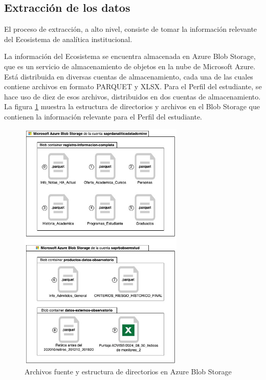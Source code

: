 \subsection{Extracción de los datos}
\label{subsec:extraccion}

El proceso de extracción, a alto nivel, consiste de tomar la información relevante del Ecosistema de analítica institucional.

La información del Ecosistema se encuentra almacenada en \gls{Azure Blob Storage}, que es un servicio de almacenamiento de objetos en la nube de Microsoft Azure. Está distribuida en diversas cuentas de almacenamiento, cada una de las cuales contiene archivos en formato PARQUET y XLSX. Para el Perfil del estudiante, se hace uso de diez de esos archivos, distribuidos en dos cuentas de almacenamiento. La figura \ref{fig:blob_storage} muestra la estructura de directorios y archivos en el Blob Storage que contienen la información relevante para el Perfil del estudiante.

\begin{figure}[h]
	\centering
	\includegraphics[width=0.7\textwidth]{img/blob_storage.jpg}
	\caption{Archivos fuente y estructura de directorios en Azure Blob Storage}
	\label{fig:blob_storage}
\end{figure}

